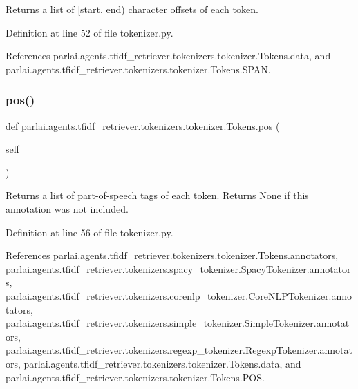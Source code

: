 \begin{DoxyVerb}Returns a list of [start, end) character offsets of each token.\end{DoxyVerb}
 

Definition at line 52 of file tokenizer.\+py.



References parlai.\+agents.\+tfidf\+\_\+retriever.\+tokenizers.\+tokenizer.\+Tokens.\+data, and parlai.\+agents.\+tfidf\+\_\+retriever.\+tokenizers.\+tokenizer.\+Tokens.\+S\+P\+AN.

\mbox{\label{classparlai_1_1agents_1_1tfidf__retriever_1_1tokenizers_1_1tokenizer_1_1Tokens_a5aa226b8190b5e72dbe0515caf0a21d6}} 
\subsubsection{\texorpdfstring{pos()}{pos()}}
{\footnotesize\ttfamily def parlai.\+agents.\+tfidf\+\_\+retriever.\+tokenizers.\+tokenizer.\+Tokens.\+pos (\begin{DoxyParamCaption}\item[{}]{self }\end{DoxyParamCaption})}

\begin{DoxyVerb}Returns a list of part-of-speech tags of each token.
Returns None if this annotation was not included.
\end{DoxyVerb}
 

Definition at line 56 of file tokenizer.\+py.



References parlai.\+agents.\+tfidf\+\_\+retriever.\+tokenizers.\+tokenizer.\+Tokens.\+annotators, parlai.\+agents.\+tfidf\+\_\+retriever.\+tokenizers.\+spacy\+\_\+tokenizer.\+Spacy\+Tokenizer.\+annotators, parlai.\+agents.\+tfidf\+\_\+retriever.\+tokenizers.\+corenlp\+\_\+tokenizer.\+Core\+N\+L\+P\+Tokenizer.\+annotators, parlai.\+agents.\+tfidf\+\_\+retriever.\+tokenizers.\+simple\+\_\+tokenizer.\+Simple\+Tokenizer.\+annotators, parlai.\+agents.\+tfidf\+\_\+retriever.\+tokenizers.\+regexp\+\_\+tokenizer.\+Regexp\+Tokenizer.\+annotators, parlai.\+agents.\+tfidf\+\_\+retriever.\+tokenizers.\+tokenizer.\+Tokens.\+data, and parlai.\+agents.\+tfidf\+\_\+retriever.\+tokenizers.\+tokenizer.\+Tokens.\+P\+OS.

